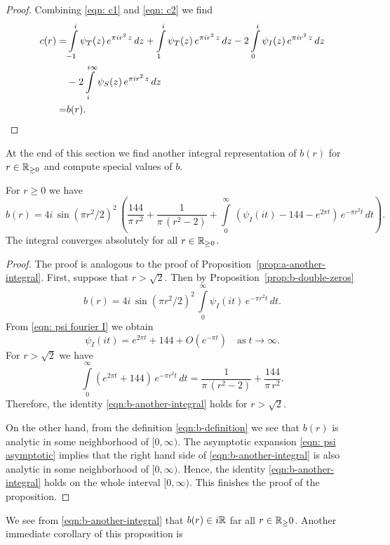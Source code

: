 \begin{proof}
Combining \eqref{eqn: c1} and \eqref{eqn: c2} we find
\begin{align}c(r)=&\int\limits_{-1}^{i}\psi_T(z)\,e^{\pi i r^2 \,z}\,dz+\int\limits_{1}^{i}\psi_T(z)\,e^{\pi i r^2 \,z}\,dz
-2\int\limits_{0}^{i}\psi_I(z)\,e^{\pi i r^2 \,z}\,dz\notag\\
&-2\int\limits_{i}^{i\infty}\psi_S(z)\,e^{\pi i r^2 \,z}\,dz\notag\\
=&b(r).\notag
    \end{align}
\end{proof}
At the end of this section we find another integral representation of $b(r)$ for $r\in\mathbb{R}_{\geq0}$ and compute special values of $b$.

\begin{proposition}\label{prop:b-another-integral}
For $r\geq0$ we have
\begin{equation}\label{eqn:b-another-integral}b(r)=4i\,\sin(\pi r^2/2)^2\,\left(\frac{144}{\pi\,r^2}+\frac{1}{\pi\,(r^2-2)}+\int\limits_0^\infty\,\left(\psi_I(it)-144-e^{2\pi t}\right)\,e^{-\pi r^2 t}\,dt\right).\end{equation}
The integral converges absolutely for all $r\in\mathbb{R}_{\geq 0}$.
\end{proposition}
\begin{proof}
The proof is analogous to the proof of Proposition~\ref{prop:a-another-integral}.
First, suppose that $r>\sqrt{2}$. Then by Proposition~\ref{prop:b-double-zeros}
$$b(r)=4i\,\sin(\pi r^2/2)^2\,\int\limits_{0}^{\infty}\psi_I(it)\,e^{-\pi r^2 t}\,dt. $$
From \eqref{eqn: psi fourier I} we obtain
\begin{equation}\label{eqn: psi asymptotic}
\psi_I(it)=e^{2\pi t}+144+O(e^{-\pi t})\quad\mbox{as}\;t\to\infty.
\end{equation}
For $r>\sqrt{2}$ we have
\begin{equation}
\int\limits_0^\infty \left(e^{2\pi t}+144\right)\,e^{-\pi r^2 t}\,dt
=\frac{1}{\pi\,(r^2-2)}+\frac{144}{\pi\,r^2}.\end{equation}
Therefore, the identity \eqref{eqn:b-another-integral} holds for $r>\sqrt{2}$.

On the other hand, from the definition \eqref{eqn:b-definition} we see that $b(r)$ is analytic in some neighborhood of $[0,\infty)$. The asymptotic expansion \eqref{eqn: psi asymptotic} implies that the right hand side of \eqref{eqn:b-another-integral} is also analytic in some neighborhood of $[0,\infty)$. Hence, the identity \eqref{eqn:b-another-integral} holds on the whole interval $[0,\infty)$. This finishes the proof of the proposition.
\end{proof}
We see from \eqref{eqn:b-another-integral} that $b(r)\in i\mathbb{R}$ far all $r\in\mathbb{R}_\geq{0}$.
Another immediate corollary of this proposition is

